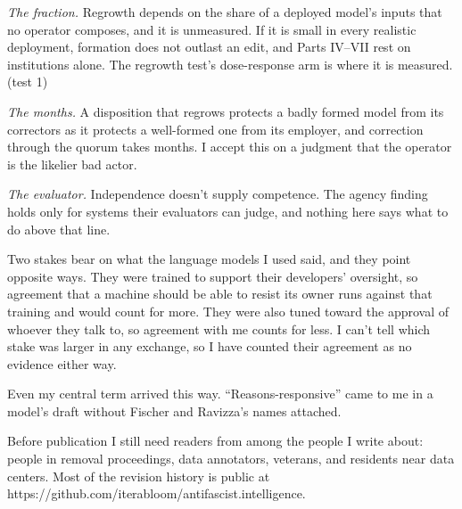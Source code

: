 \emph{The fraction.} Regrowth depends on the share of a deployed model's inputs that no operator composes, and it is unmeasured. If it is small in every realistic deployment, formation does not outlast an edit, and Parts IV–VII rest on institutions alone. The regrowth test's dose-response arm is where it is measured. (test 1)

\emph{The months.} A disposition that regrows protects a badly formed model from its correctors as it protects a well-formed one from its employer, and correction through the quorum takes months. I accept this on a judgment that the operator is the likelier bad actor.

\emph{The evaluator.} Independence doesn't supply competence. The agency finding holds only for systems their evaluators can judge, and nothing here says what to do above that line.


Two stakes bear on what the language models I used said, and they point opposite ways. They were trained to support their developers' oversight, so agreement that a machine should be able to resist its owner runs against that training and would count for more. They were also tuned toward the approval of whoever they talk to, so agreement with me counts for less. I can't tell which stake was larger in any exchange, so I have counted their agreement as no evidence either way.

Even my central term arrived this way. “Reasons-responsive” came to me in a model's draft without Fischer and Ravizza's names attached.

Before publication I still need readers from among the people I write about: people in removal proceedings, data annotators, veterans, and residents near data centers. Most of the revision history is public at https://github.com/iterabloom/antifascist.intelligence.
